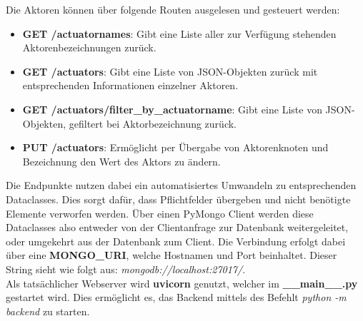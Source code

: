 Die Aktoren können über folgende Routen ausgelesen und gesteuert werden:
\begin{itemize}
\item \textbf{GET /actuatornames}: Gibt eine Liste aller zur Verfügung stehenden Aktorenbezeichnungen zurück.
\item \textbf{GET /actuators}: Gibt eine Liste von JSON-Objekten zurück mit entsprechenden Informationen einzelner Aktoren.
\item \textbf{GET /actuators/filter\_by\_actuatorname}: Gibt eine Liste von JSON-Objekten, gefiltert bei Aktorbezeichnung zurück.
\item \textbf{PUT /actuators}: Ermöglicht per Übergabe von Aktorenknoten und Bezeichnung den Wert des Aktors zu ändern.
\end{itemize}

Die Endpunkte nutzen dabei ein automatisiertes Umwandeln zu entsprechenden Dataclasses.
Dies sorgt dafür, dass Pflichtfelder übergeben und nicht benötigte Elemente verworfen werden.
Über einen PyMongo Client werden diese Dataclasses also entweder von der Clientanfrage zur Datenbank weitergeleitet, oder umgekehrt aus der Datenbank zum Client.
Die Verbindung erfolgt dabei über eine \textbf{MONGO\_URI}, welche Hostnamen und Port beinhaltet. Dieser String sieht wie folgt aus: \textit{mongodb://localhost:27017/}. \\
Als tatsächlicher Webserver wird \textbf{uvicorn} genutzt, welcher im \textbf{\_\_main\_\_.py} gestartet wird. Dies ermöglicht es, das Backend mittels des Befehlt \textit{python -m backend} zu starten.

